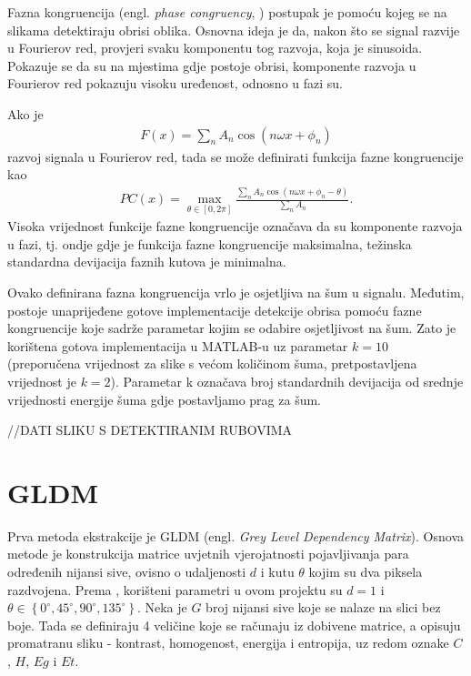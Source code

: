\documentclass{report}
\begin{document}
Fazna kongruencija (engl. \textit{phase congruency}, \cite{phasecong}) postupak je pomoću kojeg se na slikama detektiraju obrisi oblika. Osnovna ideja je da, nakon što se signal razvije u Fourierov red, provjeri svaku komponentu tog razvoja, koja je sinusoida. Pokazuje se da su na mjestima gdje postoje obrisi, komponente razvoja u Fourierov red pokazuju visoku uređenost, odnosno u fazi su.

Ako je  
\begin{align*}
F(x) = \sum_n A_n\cos(n \omega x + \phi_n)
\end{align*}
razvoj signala u Fourierov red, tada se može definirati funkcija fazne kongruencije kao
\begin{align*}
PC(x) = \max_{\theta \in [0, 2\pi]}\frac{\sum_n A_n \cos(n \omega x + \phi_n - \theta)}{\sum_n A_n}.
\end{align*}
Visoka vrijednost funkcije fazne kongruencije označava da su komponente razvoja u fazi, tj. ondje gdje je funkcija fazne kongruencije maksimalna, težinska standardna devijacija faznih kutova je minimalna.

Ovako definirana fazna kongruencija vrlo je osjetljiva na šum u signalu. Međutim, postoje unaprijeđene gotove implementacije detekcije obrisa pomoću fazne kongruencije koje sadrže parametar kojim se odabire osjetljivost na šum. Zato je korištena gotova implementacija u MATLAB-u uz parametar $k = 10$ (preporučena vrijednost za slike s većom količinom šuma, pretpostavljena vrijednost je $k = 2$). Parametar k označava broj standardnih devijacija od srednje vrijednosti energije šuma gdje postavljamo prag za šum. 

//DATI SLIKU S DETEKTIRANIM RUBOVIMA 

\section{GLDM}
Prva metoda ekstrakcije je GLDM (engl. \textit{Grey Level Dependency Matrix}). Osnova metode je konstrukcija matrice uvjetnih vjerojatnosti pojavljivanja para određenih nijansi sive, ovisno o udaljenosti $d$ i kutu $\theta$ kojim su dva piksela razdvojena. Prema \cite{main_paper}, korišteni parametri u ovom projektu su $d = 1$ i $\theta \in \left\lbrace0^\circ, 45^\circ, 90^\circ, 135^\circ\right\rbrace$.
Neka je $G$ broj nijansi sive koje se nalaze na slici bez boje. Tada se definiraju 4 veličine koje se računaju iz dobivene matrice, a opisuju promatranu sliku - kontrast, homogenost, energija i entropija, uz redom oznake $C$, $H$, $Eg$ i $Et$.
\end{document}
